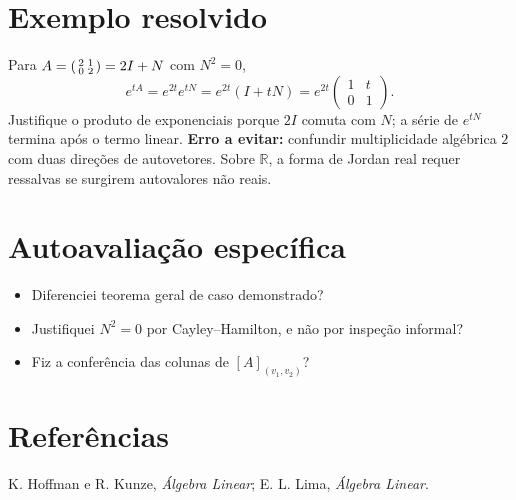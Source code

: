 \documentclass[11pt,a4paper]{article}
\begin{document}
\section{Exemplo resolvido}
Para $A=\begin{psmallmatrix}2&1\\0&2\end{psmallmatrix}=2I+N$ com $N^2=0$,
\[
e^{tA}=e^{2t}e^{tN}
=e^{2t}(I+tN)
=e^{2t}\begin{pmatrix}1&t\\0&1\end{pmatrix}.
\]
Justifique o produto de exponenciais porque $2I$ comuta com $N$; a série de $e^{tN}$ termina após o termo linear. \textbf{Erro a evitar:} confundir multiplicidade algébrica $2$ com duas direções de autovetores. Sobre $\mathbb R$, a forma de Jordan real requer ressalvas se surgirem autovalores não reais.
\section{Autoavaliação específica}
\begin{itemize}
\item Diferenciei teorema geral de caso demonstrado?
\item Justifiquei $N^2=0$ por Cayley--Hamilton, e não por inspeção informal?
\item Fiz a conferência das colunas de $[A]_{(v_1,v_2)}$?
\end{itemize}
\RubricaUFMT
\section{Referências}
K. Hoffman e R. Kunze, \emph{Álgebra Linear}; E. L. Lima, \emph{Álgebra Linear}.
\end{document}
